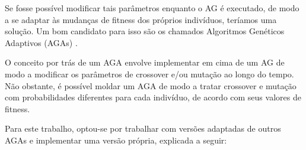 Se fosse possível modificar tais parâmetros enquanto o AG é executado, de modo a se adaptar às mudanças de fitness dos próprios indivíduos, teríamos uma solução. Um bom candidato para isso são os chamados Algoritmos Genéticos Adaptivos (AGAs) \cite{srinivas1994adaptive}.

O conceito por trás de um AGA envolve implementar em cima de um AG de modo a modificar os parâmetros de crossover e/ou mutação ao longo do tempo. Não obstante, é possível moldar um AGA de modo a tratar crossover e mutação com probabilidades diferentes para cada indivíduo, de acordo com seus valores de fitness.

Para este trabalho, optou-se por trabalhar com versões adaptadas de outros AGAs \cite{jakobovic1999adaptive, wang2001improved, srinivas1994adaptive} e implementar uma versão própria, explicada a seguir:

